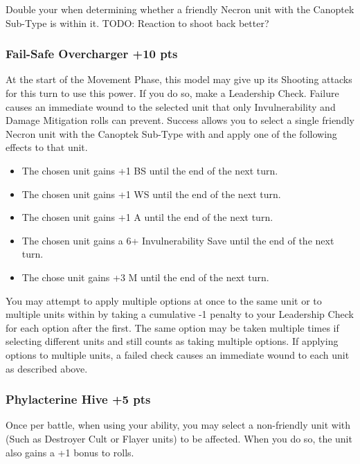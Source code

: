 Double your  when determining whether a friendly Necron unit with the Canoptek Sub-Type is within it. TODO: Reaction to shoot back better?

\subsubsection[Fail-Safe Overcharger ]{Fail-Safe Overcharger  \hrulefill +10 pts}

At the start of the Movement Phase, this model may give up its Shooting attacks for this turn to use this power. If you do so, make a Leadership Check. Failure causes an immediate wound to the selected unit that only Invulnerability and Damage Mitigation rolls can prevent. Success allows you to select a single friendly Necron unit with the Canoptek Sub-Type with  and apply one of the following effects to that unit.

\begin{itemize}
	\item The chosen unit gains +1 BS until the end of the next turn.
	\item The chosen unit gains +1 WS until the end of the next turn.
	\item The chosen unit gains +1 A until the end of the next turn.
	\item The chosen unit gains a 6+ Invulnerability Save until the end of the next turn.
	\item The chose unit gains +3 M until the end of the next turn.
\end{itemize}

You may attempt to apply multiple options at once to the same unit or to multiple units within  by taking a cumulative -1 penalty to your Leadership Check for each option after the first. The same option may be taken multiple times if selecting different units and still counts as taking multiple options. If applying options to multiple units, a failed check causes an immediate wound to each unit as described above.

\subsubsection[Phylacterine Hive ]{Phylacterine Hive  \hrulefill +5 pts}

Once per battle, when using your  ability, you may select a non-friendly unit with  (Such as Destroyer Cult or Flayer units) to be affected. When you do so, the unit also gains a +1 bonus to  rolls.

